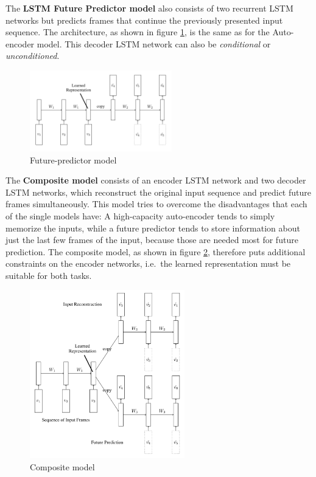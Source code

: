 The \textbf{LSTM Future Predictor model} also consists of two recurrent LSTM networks but predicts frames that continue the previously presented input sequence.
The architecture, as shown in figure \ref{fig:unsupervisedlstms_futurepredictor}, is the same as for the Auto-encoder model.
This decoder LSTM network can also be \textit{conditional} or \textit{unconditioned}.

\begin{figure}[H]
    \centering
    \includegraphics[width=0.55\textwidth]{img_deep/unsupervisedlstms_futurepredictor}
    \caption{Future-predictor model \cite{srivastava_unsupervised_2015}}
    \label{fig:unsupervisedlstms_futurepredictor}
\end{figure}

The \textbf{Composite model} consists of an encoder LSTM network and two decoder LSTM networks, which reconstruct the original input sequence and predict future frames simultaneously.
This model tries to overcome the disadvantages that each of the single models have: A high-capacity auto-encoder tends to simply memorize the inputs, while a future predictor tends to store information about just the last few frames of the input, because those are needed most for future prediction.
The composite model, as shown in figure \ref{fig:unsupervisedlstms_composite}, therefore puts additional constraints on the encoder networks, i.e.\ the learned representation must be suitable for both tasks.

\begin{figure}[H]
    \centering
    \includegraphics[width=0.6\textwidth]{img_deep/unsupervisedlstms_composite}
    \caption{Composite model \cite{srivastava_unsupervised_2015}}
    \label{fig:unsupervisedlstms_composite}
\end{figure}

